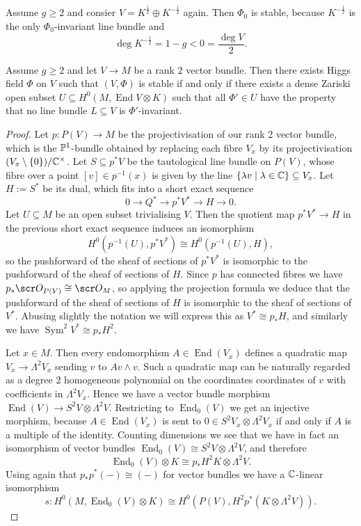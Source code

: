 \documentclass[A4paper, 12pt, british, reqno]{amsart}
\DeclareMathOperator{\End}{End}
\DeclareMathOperator{\Sym}{Sym}
\newcommand{\ot}{\otimes}
\newcommand{\op}{\oplus}
\newcommand{\dual}{^{*}}
\begin{document}
\begin{exa}
    Assume $g\geqslant 2$ and consier $V=K^{\frac{1}{2}}\op K^{-\frac{1}{2}}$ again.
    Then $\Phi_{0}$ is stable, because $K^{-\frac{1}{2}}$ is the only $\Phi_{0}$-invariant line bundle and
    \[ \deg{K^{-\frac{1}{2}}}=1-g<0=\frac{\deg{V}}{2}. \]
\end{exa}

\begin{prop}
    Assume $g\geqslant 2$ and let $V\to M$ be a rank $2$ vector bundle.
Then there exists Higgs field $\Phi$ on $V$ such that $(V,\Phi)$ is stable if and only if there exists a dense Zariski open subset $U\subseteq H^{0}(M,\End{V}\ot K)$ such that all $\Phi'\in U$ have the property that no line bundle $L\subseteq V$ is $\Phi'$-invariant.
    \begin{proof}
	Let $p\colon P(V)\to M$ be the projectivisation of our rank 2 vector bundle, which is the $\P^{1}$-bundle obtained by replacing each fibre $V_{x}$ by its projectivisation $(V_{x}\setminus \{0\})/\C^{\times}$.
	Let $S\subseteq p^{*}V$ be the tautological line bundle on $P(V)$, whose fibre over a point $[v]\in p^{-1}(x)$ is given by the line $\{ \lambda v \mid \lambda \in \C \}\subseteq V_{x}$.
	Let $H:=S\dual$ be its dual, which fits into a short exact sequence
	\[ 0\to Q\dual \to p^{*}V\dual \to H \to 0. \]
	Let $U\subseteq M$ be an open subset trivialising $V$.
	Then the quotient map $p^{*}V\dual \to H$ in the previous short exact sequence induces an isomorphism
	\[ H^{0}(p^{-1}(U),p^{*}V\dual)\cong H^{0}(p^{-1}(U),H), \]
	so the pushforward of the sheaf of sections of $p^{*}V\dual$ is isomorphic to the pushforward of the sheaf of sections of $H$.
	Since $p$ has connected fibres we have $p_{*}\O_{P(V)}\cong \O_{M}$, so applying the projection formula \cite[Exercise II.5.1.d]{har77} we deduce that the pushforward of the sheaf of sections of $H$ is isomorphic to the sheaf of sections of $V\dual$.
	Abusing slightly the notation we will express this as $V\dual \cong p_{*}H$, and similarly we have $\Sym^{2}V\dual\cong p_{*}H^{2}$.

	Let $x\in M$.
	Then every endomorphism $A\in \End(V_{x})$ defines a quadratic map $V_{x}\to \Lambda^{2}V_{x}$ sending $v$ to $Av\wedge v$.
	Such a quadratic map can be naturally regarded as a degree $2$ homogeneous polynomial on the coordinates coordinates of $v$ with coefficients in $\Lambda^{2}V_{x}$.
	Hence we have a vector bundle morphism $\End(V)\to S^{2}V\ot \Lambda^{2}V$.
	Restricting to $\End_{0}(V)$ we get an injective morphism, because $A\in \End(V_{x})$ is sent to $0\in S^{2}V_{x}\ot \Lambda^{2}V_{x}$ if and only if $A$ is a multiple of the identity.
	Counting dimensions we see that we have in fact an isomorphism of vector bundles $\End_{0}(V)\cong S^{2}V\ot \Lambda^{2}V$, and therefore
	\[ \End_{0}(V)\ot K\cong p_{*}H^{2}K\ot \Lambda^{2}V. \]
	Using again that $p_{*}p^{*}(-)\cong (-)$ for vector bundles we have a $\C$-linear isomorphism
	\[ s\colon H^{0}(M,\End_{0}(V)\ot K)\cong H^{0}(P(V),H^{2}p^{*}(K\ot \Lambda^{2}V)). \]


\end{proof}
\end{prop}
\end{document}
